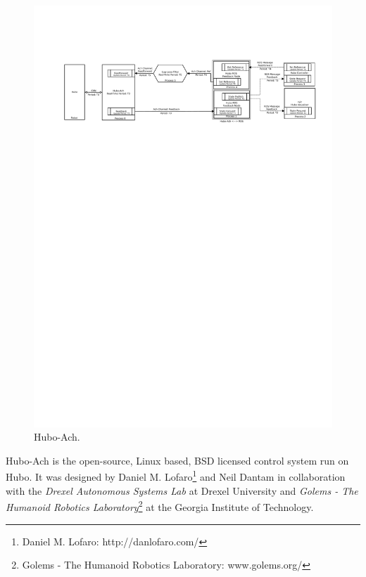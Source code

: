 
\begin{figure}[thpb]
  \centering
\includegraphics[width=2.0\columnwidth]{./pix/hubo-ach-diagram-ros.pdf}
  \caption{Hubo-Ach.}
  \label{fig:graph}
\end{figure}


Hubo-Ach is the open-source, Linux based, BSD licensed control system run on Hubo.  
It was designed by Daniel M. Lofaro\footnote{Daniel M. Lofaro: http://danlofaro.com/} and Neil Dantam in collaboration with the \textit{Drexel Autonomous Systems Lab} at Drexel University and \textit{Golems - The Humanoid Robotics Laboratory}\footnote{Golems - The Humanoid Robotics Laboratory: www.golems.org/} at the Georgia Institute of Technology.  

